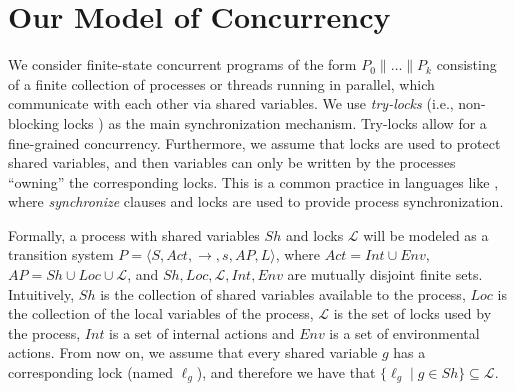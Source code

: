 
\section{Our Model of Concurrency}\label{sec:approach}
We consider finite-state concurrent programs of the form $P_0 \parallel \dots \parallel P_k$ consisting of a finite collection of processes or threads running in parallel, which communicate with each other via shared variables. We use \emph{try-locks} (i.e., non-blocking locks \cite{OaksWong2004}) as the main synchronization mechanism. Try-locks allow for a fine-grained concurrency. Furthermore, we assume that  locks are used to protect shared variables, and then variables can only be written by the processes ``owning'' the corresponding locks. This is a common practice in languages like {\JAVA}, where \emph{synchronize} clauses and locks are used  to provide process synchronization. 


Formally, a process with shared variables $\mathit{Sh}$ and locks $\mathcal{L}$ will be modeled as a transition system $P = \langle S, \mathit{Act},  \rightarrow, s, \mathit{AP}, L \rangle$, where $\mathit{Act} = \mathit{Int} \cup \mathit{Env}$, $\mathit{AP} = \mathit{Sh} \cup \mathit{Loc} \cup \mathcal{L}$, and $\mathit{Sh}, \mathit{Loc}, \mathcal{L}, \mathit{Int}, \mathit{Env}$ are mutually disjoint finite sets. 
Intuitively, $\mathit{Sh}$ is the collection of shared variables available to the process, $\mathit{Loc}$ is the collection of the local variables of the process, $\mathcal{L}$ is the set of locks used by the process, $\mathit{Int}$ is a set of internal actions and $\mathit{Env}$ is a set of environmental actions. From now on, we assume that every shared variable $g$ has a corresponding lock (named $\ell_g$), and therefore we have that $\{\ell_g \mid g \in Sh\} \subseteq \mathcal{L}$. %

